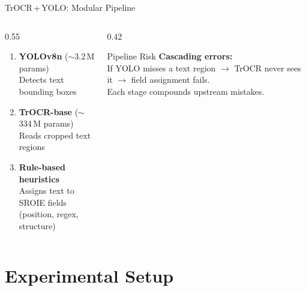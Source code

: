 \documentclass[aspectratio=169,11pt]{beamer}
\begin{document}
\begin{frame}{TrOCR\,+\,YOLO: Modular Pipeline}
  \begin{columns}[T]
    \begin{column}{0.55\textwidth}
      \begin{enumerate}
        \item \textbf{YOLOv8n} ($\sim$3.2\,M params)\\
              Detects text bounding boxes
        \item \textbf{TrOCR-base} ($\sim$334\,M params)\\
              Reads cropped text regions
        \item \textbf{Rule-based heuristics}\\
              Assigns text to SROIE fields\\
              (position, regex, structure)
      \end{enumerate}
    \end{column}
    \begin{column}{0.42\textwidth}
      \begin{alertblock}{Pipeline Risk}
        \textbf{Cascading errors:}\\
        If YOLO misses a text region $\to$ TrOCR never sees it
        $\to$ field assignment fails.\\[4pt]
        Each stage compounds upstream mistakes.
      \end{alertblock}
    \end{column}
  \end{columns}
\end{frame}

\section{Experimental Setup}
\end{document}
